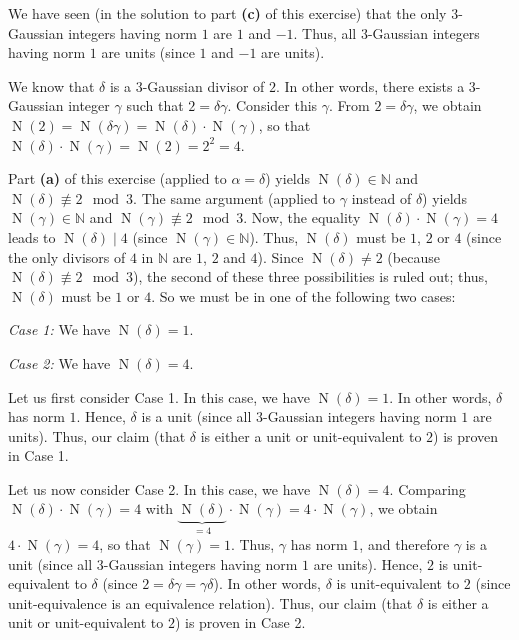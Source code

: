 \documentclass[paper=a4, fontsize=12pt]{scrartcl}%
\newcommand{\NN}{\mathbb{N}}
\newcommand{\tup}[1]{\left( #1 \right)}
\newcommand{\No}{\operatorname{N}}
\theoremstyle{plainsl}
\theoremstyle{definition}
\theoremstyle{remark}
\begin{document}
We have seen (in the solution to part \textbf{(c)} of this
exercise) that the only $3$-Gaussian integers having norm $1$ are $1$ and $-1$.
Thus, all $3$-Gaussian integers having norm $1$ are units
(since $1$ and $-1$ are units).

We know that $\delta$ is a $3$-Gaussian divisor of $2$.
In other words, there exists a $3$-Gaussian integer $\gamma$
such that $2 = \delta \gamma$. Consider this $\gamma$.
From $2 = \delta \gamma$, we obtain
$\No\tup{2} = \No\tup{\delta \gamma}
= \No\tup{\delta} \cdot \No\tup{\gamma}$,
so that
$\No\tup{\delta} \cdot \No\tup{\gamma} = \No\tup{2} = 2^2 = 4$.

Part \textbf{(a)} of this exercise (applied to $\alpha = \delta$)
yields $\No\tup{\delta} \in \NN$ and
$\No\tup{\delta} \not\equiv 2 \mod 3$.
The same argument (applied to $\gamma$ instead of $\delta$)
yields $\No\tup{\gamma} \in \NN$ and
$\No\tup{\gamma} \not\equiv 2 \mod 3$.
Now, the equality
$\No\tup{\delta} \cdot \No\tup{\gamma} = 4$
leads to $\No\tup{\delta} \mid 4$
(since $\No\tup{\gamma} \in \NN$).
Thus, $\No\tup{\delta}$ must be $1$, $2$ or $4$
(since the only divisors of $4$ in $\NN$ are
$1$, $2$ and $4$).
Since $\No\tup{\delta} \neq 2$ (because
$\No\tup{\delta} \not\equiv 2 \mod 3$), the second of these
three possibilities is ruled out;
thus, $\No\tup{\delta}$ must be $1$ or $4$.
So we must be in one of the following two cases:

\textit{Case 1:} We have $\No\tup{\delta} = 1$.

\textit{Case 2:} We have $\No\tup{\delta} = 4$.

Let us first consider Case 1.
In this case, we have $\No\tup{\delta} = 1$.
In other words, $\delta$ has norm $1$.
Hence, $\delta$ is a unit
(since all $3$-Gaussian integers having norm $1$ are units).
Thus, our claim (that $\delta$ is either a unit or unit-equivalent to $2$)
is proven in Case 1.

Let us now consider Case 2.
In this case, we have $\No\tup{\delta} = 4$.
Comparing $\No\tup{\delta} \cdot \No\tup{\gamma} = 4$
with $\underbrace{\No\tup{\delta}}_{=4} \cdot \No\tup{\gamma} = 4 \cdot \No\tup{\gamma}$,
we obtain $4 \cdot \No\tup{\gamma} = 4$, so that
$\No\tup{\gamma} = 1$. Thus, $\gamma$ has
norm $1$, and therefore $\gamma$ is a unit (since
all $3$-Gaussian integers having norm $1$ are units).
Hence, $2$ is unit-equivalent to $\delta$
(since $2 = \delta \gamma = \gamma \delta$).
In other words, $\delta$ is unit-equivalent
to $2$ (since unit-equivalence is an equivalence relation).
Thus, our claim (that $\delta$ is either a unit or unit-equivalent to $2$)
is proven in Case 2.
\end{document}
